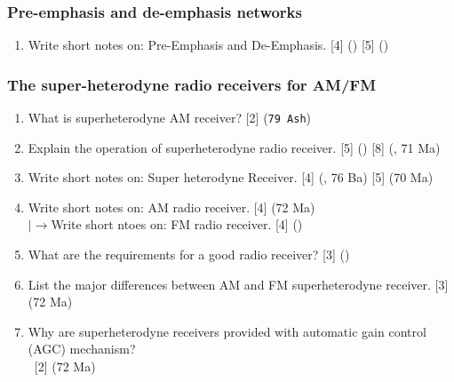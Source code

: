 \documentclass[12pt]{article}
\newcommand{\lb}{\\$\left|\rightarrow\right.$}
\newcommand{\enter}{\\\textcolor{white}{1}}
\begin{document}
    \subsubsection{Pre-emphasis and de-emphasis networks}
      \begin{enumerate}
        \item Write short notes on: Pre-Emphasis and De-Emphasis. \hfill [4] () [5] ()
      \end{enumerate}

    \subsubsection{The super-heterodyne radio receivers for AM/FM}
      \begin{enumerate}
        \item What is superheterodyne AM receiver? \hfill [2] (\texttt{79 Ash})

        \item Explain the operation of superheterodyne radio receiver. \hfill [5] () [8] (, 71 Ma)

        \item Write short notes on: Super heterodyne Receiver. \hfill [4] (, 76 Ba) [5] (70 Ma)

        \item Write short notes on: AM radio receiver. \hfill [4] (72 Ma)
        \lb Write short ntoes on: FM radio receiver. \hfill [4] ()

        \item What are the requirements for a good radio receiver? \hfill [3] ()

        \item List the major differences between AM and FM superheterodyne receiver. \hfill [3] (72 Ma)

        \item Why are superheterodyne receivers provided with automatic gain control (AGC) mechanism?
        \enter\hfill [2] (72 Ma)
      \end{enumerate}
\end{document}
